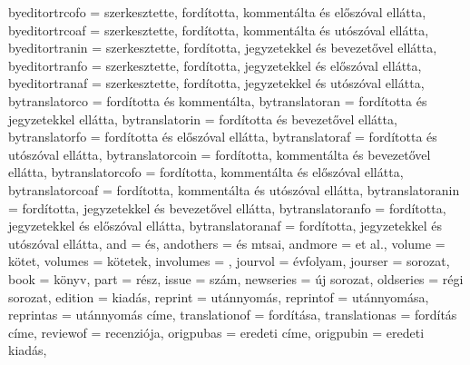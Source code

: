 {		byeditortrcofo   = {szerkesztette, \lbx@lfromlang ford\'itotta, komment\'alta \'es el\H{o}sz\'oval ell\'atta},
		byeditortrcoaf   = {szerkesztette, \lbx@lfromlang ford\'itotta, komment\'alta \'es ut\'osz\'oval ell\'atta},
		byeditortranin   = {szerkesztette, \lbx@lfromlang ford\'itotta, jegyzetekkel \'es bevezet\H{o}vel ell\'atta},
		byeditortranfo   = {szerkesztette, \lbx@lfromlang ford\'itotta, jegyzetekkel \'es el\H{o}sz\'oval ell\'atta},
		byeditortranaf   = {szerkesztette, \lbx@lfromlang ford\'itotta, jegyzetekkel \'es ut\'osz\'oval ell\'atta},
		bytranslatorco   = {\lbx@lfromlang ford\'itotta \'es komment\'alta},
		bytranslatoran   = {\lbx@lfromlang ford\'itotta \'es jegyzetekkel ell\'atta},
		bytranslatorin   = {\lbx@lfromlang ford\'itotta \'es bevezet\H{o}vel ell\'atta},
		bytranslatorfo   = {\lbx@lfromlang ford\'itotta \'es el\H{o}sz\'oval ell\'atta},
		bytranslatoraf   = {\lbx@lfromlang ford\'itotta \'es ut\'osz\'oval ell\'atta},
		bytranslatorcoin = {\lbx@lfromlang ford\'itotta, komment\'alta \'es bevezet\H{o}vel ell\'atta},
		bytranslatorcofo = {\lbx@lfromlang ford\'itotta, komment\'alta \'es el\H{o}sz\'oval ell\'atta},
		bytranslatorcoaf = {\lbx@lfromlang ford\'itotta, komment\'alta \'es ut\'osz\'oval ell\'atta},
		bytranslatoranin = {\lbx@lfromlang ford\'itotta, jegyzetekkel \'es bevezet\H{o}vel ell\'atta},
		bytranslatoranfo = {\lbx@lfromlang ford\'itotta, jegyzetekkel \'es el\H{o}sz\'oval ell\'atta},
		bytranslatoranaf = {\lbx@lfromlang ford\'itotta, jegyzetekkel \'es ut\'osz\'oval ell\'atta},
		and              = {\'es},
		andothers        = {\'es mtsai\addot},
		andmore          = {et\addabbrvspace al\adddot},
		volume           = {k\"otet},
		volumes          = {k\"otetek},
		involumes        = {},
		jourvol          = {\'evfolyam},
		jourser          = {sorozat},
		book             = {k\"onyv},
		part             = {r\'esz},
		issue            = {sz\'am},
		newseries        = {\'uj sorozat},
		oldseries        = {r\'egi sorozat},
		edition          = {kiad\'as},
		reprint          = {ut\'annyom\'as},
		reprintof        = {ut\'annyom\'asa},%
		reprintas        = {ut\'annyom\'as c\'ime},
		translationof    = {ford\'it\'asa},%
		translationas    = {ford\'it\'as c\'ime},
		reviewof         = {recenzi\'oja},%
		origpubas        = {eredeti c\'ime},
		origpubin        = {eredeti kiad\'as},
}
